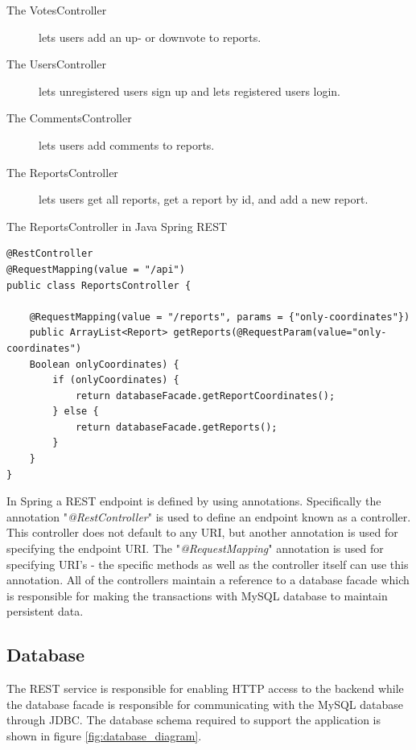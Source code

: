 \begin{description}
\item [The VotesController] lets users add an up- or downvote to reports.
\item [The UsersController] lets unregistered users sign up and lets registered users login.
\item [The CommentsController] lets users add comments to reports.
\item [The ReportsController] lets users get all reports, get a report by id, and add a new report.
\end{description}

\begin{listing}[H]
\caption{The ReportsController in Java Spring REST}\label{lst:restController}
\begin{verbatim}
@RestController
@RequestMapping(value = "/api")
public class ReportsController {

    @RequestMapping(value = "/reports", params = {"only-coordinates"})
    public ArrayList<Report> getReports(@RequestParam(value="only-coordinates")
    Boolean onlyCoordinates) {
        if (onlyCoordinates) {
            return databaseFacade.getReportCoordinates();
        } else {
            return databaseFacade.getReports();
        }
    }
}
\end{verbatim}
\end{listing}

In Spring a REST endpoint is defined by using annotations. Specifically the annotation "\textit{@RestController}" is used to define an endpoint known as a  controller. This controller does not default to any URI, but another annotation is used for specifying the endpoint URI. The "\textit{@RequestMapping}" annotation is used for specifying URI's - the specific methods as well as the controller itself can use this annotation. All of the controllers maintain a reference to a database facade which is responsible for making the transactions with MySQL database to maintain persistent data.

\subsection{Database}
The REST service is responsible for enabling HTTP access to the backend while the database facade is responsible for communicating with the MySQL database through JDBC. The database schema required to support the application is shown in figure \ref{fig:database_diagram}.

